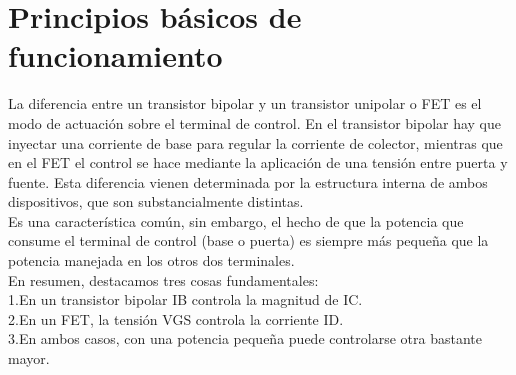 \documentclass[10pt,a4paper]{article}
\begin{document}
\section{Principios básicos de funcionamiento}
La diferencia entre un transistor bipolar y un transistor unipolar o FET es el modo de actuación sobre el terminal de control. En el transistor bipolar hay que inyectar una corriente de base para regular la corriente de colector, mientras que en el FET el control se hace mediante la aplicación de una tensión entre puerta y fuente. Esta diferencia vienen determinada por la estructura interna de ambos dispositivos, que son substancialmente distintas.\\
\bigskip
Es una característica común, sin embargo, el hecho de que la potencia que consume el terminal de control (base o puerta) es siempre más pequeña que la potencia manejada en los otros dos terminales.\\
\bigskip
En resumen, destacamos tres cosas fundamentales:\\
1.En un transistor bipolar IB controla la magnitud de IC.\\
2.En un FET, la tensión VGS controla la corriente ID.\\
3.En ambos casos, con una potencia pequeña puede controlarse otra bastante mayor.\\
\end{document}
